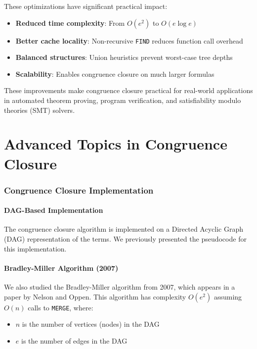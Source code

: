 \documentclass[11pt,a4paper]{article}
\theoremstyle{definition}
\theoremstyle{plain}
\theoremstyle{remark}
\begin{document}
These optimizations have significant practical impact:
\begin{itemize}
    \item \textbf{Reduced time complexity}: From $O(e^2)$ to $O(e \log e)$
    \item \textbf{Better cache locality}: Non-recursive \texttt{FIND} reduces function call overhead
    \item \textbf{Balanced structures}: Union heuristics prevent worst-case tree depths
    \item \textbf{Scalability}: Enables congruence closure on much larger formulas
\end{itemize}

These improvements make congruence closure practical for real-world applications in automated theorem proving, program verification, and satisfiability modulo theories (SMT) solvers. 

\newpage

\part{Advanced Topics in Congruence Closure}

\section{Congruence Closure Implementation}

\subsection{DAG-Based Implementation}

The congruence closure algorithm is implemented on a Directed Acyclic Graph (DAG) representation of the terms. We previously presented the pseudocode for this implementation.

\subsection{Bradley-Miller Algorithm (2007)}

We also studied the Bradley-Miller algorithm from 2007, which appears in a paper by Nelson and Oppen. This algorithm has complexity $O(e^2)$ assuming $O(n)$ calls to \texttt{MERGE}, where:
\begin{itemize}
    \item $n$ is the number of vertices (nodes) in the DAG
    \item $e$ is the number of edges in the DAG
\end{itemize}
\end{document}

